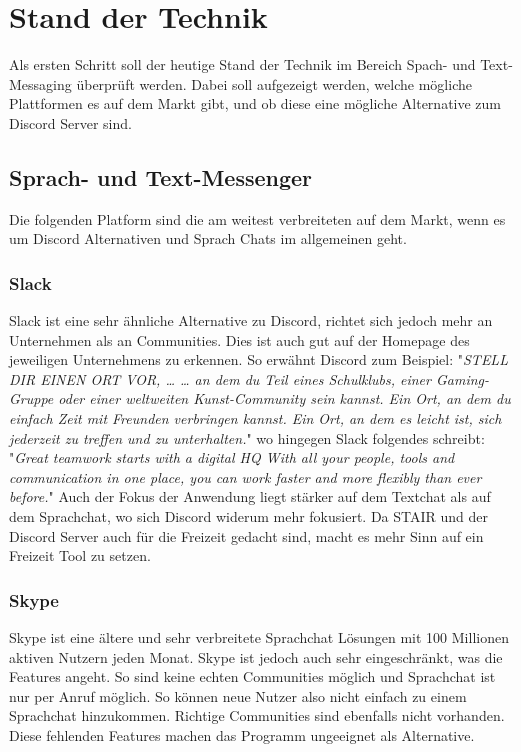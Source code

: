 \documentclass[a4paper, table]{article}
\begin{document}
\newpage
\section{Stand der Technik}\label{state-of-the-art}
Als ersten Schritt soll der heutige Stand der Technik im Bereich Spach- und Text-Messaging überprüft werden.
Dabei soll aufgezeigt werden, welche mögliche Plattformen es auf dem Markt gibt, und ob diese eine mögliche Alternative zum Discord Server sind.

\subsection{Sprach- und Text-Messenger}
Die folgenden Platform sind die am weitest verbreiteten auf dem Markt, wenn es um Discord Alternativen und Sprach Chats im allgemeinen geht. \autocite{noauthor_discord-alternativen_nodate}

\subsubsection*{Slack}
Slack ist eine sehr ähnliche Alternative zu Discord, richtet sich jedoch mehr an Unternehmen als an Communities.
Dies ist auch gut auf der Homepage des jeweiligen Unternehmens zu erkennen.
So erwähnt Discord zum Beispiel: "\textit{STELL DIR EINEN ORT VOR, …
… an dem du Teil eines Schulklubs, einer Gaming-Gruppe oder einer weltweiten Kunst-Community sein kannst. Ein Ort, an dem du einfach Zeit mit Freunden verbringen kannst. Ein Ort, an dem es leicht ist, sich jederzeit zu treffen und zu unterhalten.}" \autocite{noauthor_discord_nodate}
wo hingegen Slack folgendes schreibt: "\textit{Great teamwork starts with a digital HQ
With all your people, tools and communication in one place, you can work faster and more flexibly than ever before.}"\autocite{slack_slack_nodate}
Auch der Fokus der Anwendung liegt stärker auf dem Textchat als auf dem Sprachchat, wo sich Discord widerum mehr fokusiert.\autocite{noauthor_slack_nodate}
Da STAIR und der Discord Server auch für die Freizeit gedacht sind, macht es mehr Sinn auf ein Freizeit Tool zu setzen.

\subsubsection*{Skype}
Skype ist eine ältere und sehr verbreitete Sprachchat Lösungen mit 100 Millionen aktiven Nutzern jeden Monat. \autocite{lardinois_microsoft_2020}
Skype ist jedoch auch sehr eingeschränkt, was die Features angeht.
So sind keine echten Communities möglich und Sprachchat ist nur per Anruf möglich.
So können neue Nutzer also nicht einfach zu einem Sprachchat hinzukommen.
Richtige Communities sind ebenfalls nicht vorhanden. \autocite{mattise_discord_2022}
Diese fehlenden Features machen das Programm ungeeignet als Alternative.
\end{document}
